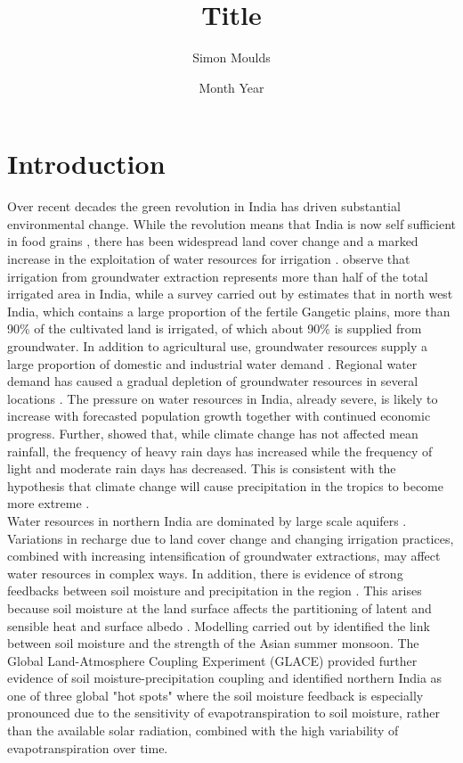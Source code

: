 \documentclass{icldt}
\title{Title}
\author{Simon Moulds}
\date{Month Year}
\begin{document}
\chapter{Introduction}

Over recent decades the green revolution in India has driven substantial environmental change. While the revolution means that India is now self sufficient in food grains \citep{Singh2000}, there has been widespread land cover change and a marked increase in the exploitation of water resources for irrigation \citep{Roy2007}. \citet{Scott2009} observe that irrigation from groundwater extraction represents more than half of the total irrigated area in India, while a survey carried out by \citet{Shah2006} estimates that in north west India, which contains a large proportion of the fertile Gangetic plains, more than 90\% of the cultivated land is irrigated, of which about 90\% is supplied from groundwater. In addition to agricultural use, groundwater resources supply a large proportion of domestic and industrial water demand \citep{Amarasinghe2005}. Regional water demand has caused a gradual depletion of groundwater resources in several locations \citep{Rodell2009}. The pressure on water resources in India, already severe, is likely to increase with forecasted population growth together with continued economic progress. Further, \citet{Goswami2006} showed that, while climate change has not affected mean rainfall, the frequency of heavy rain days has increased while the frequency of light and moderate rain days has decreased. This is consistent with the hypothesis that climate change will cause precipitation in the tropics to become more extreme \citep{Trenberth2003}. \\

Water resources in northern India are dominated by large scale aquifers \citep{Bandy1995}. Variations in recharge due to land cover change and changing irrigation practices, combined with increasing intensification of groundwater extractions, may affect water resources in complex ways. In addition, there is evidence of strong feedbacks between soil moisture and precipitation in the region \citep[e.g.][]{Meehl1994,Koster2004,Niyogi2010}. This arises because soil moisture at the land surface affects the partitioning of latent and sensible heat and surface albedo \citet{Eltahir1998}. Modelling carried out by \citet{Meehl1994} identified the link between soil moisture and the strength of the Asian summer monsoon. The Global Land-Atmosphere Coupling Experiment (GLACE) \citep{Koster2004,Koster2006,Guo2006} provided further evidence of soil moisture-precipitation coupling and identified northern India as one of three global "hot spots" where the soil moisture feedback is especially pronounced due to the sensitivity of evapotranspiration to soil moisture, rather than the available solar radiation, combined with the high variability of evapotranspiration over time. \\
\end{document}
